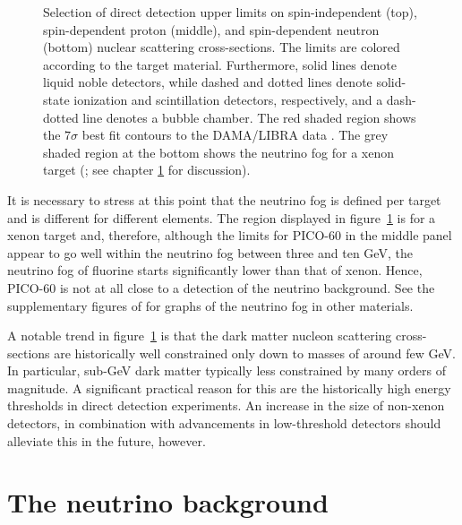 \documentclass[b5paper, 10pt, twoside]{book}
\newcommand{\annotatestyle}{\sbsfstyle}
\newcommand{\nufogcolor}{scp-grey-light-2}
\begin{document}
\begin{figure}
    \vspace*{-1.0pc}
    \caption{Selection of direct detection upper limits on spin-independent (top), spin-dependent proton (middle), and spin-dependent neutron (bottom) nuclear scattering cross-sections. The limits are colored according to the target material. Furthermore, solid lines denote liquid noble detectors, while dashed and dotted lines denote solid-state ionization and scintillation detectors, respectively, and a dash-dotted line denotes a bubble chamber. The red shaded region shows the $7\sigma$ best fit contours to the DAMA/LIBRA data \parencite{SavageEtAl2009}. The grey shaded region at the bottom shows the neutrino fog for a xenon target (\textcite{OHare2021}; see chapter \ref{chap:background} for discussion).}
    \label{fig:dd-reach}
\end{figure}

It is necessary to stress at this point that the neutrino fog is defined per target and is different for different elements. The region displayed in figure~\ref{fig:dd-reach} is for a xenon target and, therefore, although the limits for PICO-60 in the middle panel appear to go well within the neutrino fog between three and ten GeV, the neutrino fog of fluorine starts significantly lower than that of xenon. Hence, PICO-60 is not at all close to a detection of the neutrino background. See the supplementary figures of \textcite{OHare2021} for graphs of the neutrino fog in other materials.

A notable trend in figure~\ref{fig:dd-reach} is that the dark matter nucleon scattering cross-sections are historically well constrained only down to masses of around few GeV. In particular, sub-GeV dark matter typically less constrained by many orders of magnitude. A significant practical reason for this are the historically high energy thresholds in direct detection experiments. An increase in the size of non-xenon detectors, in combination with advancements in low-threshold detectors should alleviate this in the future, however.

\chapter{The neutrino background}
\label{chap:background}
\end{document}
